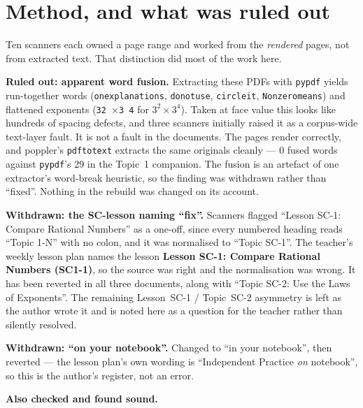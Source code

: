 \documentclass[11pt]{article}
\begin{document}
\section*{Method, and what was ruled out}
Ten scanners each owned a page range and worked from the \emph{rendered} pages,
not from extracted text. That distinction did most of the work here.

\medskip\noindent\textbf{Ruled out: apparent word fusion.}
Extracting these PDFs with \texttt{pypdf} yields run-together words
(\texttt{onexplanations}, \texttt{donotuse}, \texttt{circleit},
\texttt{Nonzeromeans}) and flattened exponents (\texttt{32 $\times$3 4} for
$3^2\times3^4$). Taken at face value this looks like hundreds of spacing
defects, and three scanners initially raised it as a corpus-wide text-layer
fault. It is not a fault in the documents. The pages render correctly, and
poppler's \texttt{pdftotext} extracts the same originals cleanly --- 0 fused
words against \texttt{pypdf}'s 29 in the Topic~1 companion. The fusion is an
artefact of one extractor's word-break heuristic, so the finding was withdrawn
rather than ``fixed''. Nothing in the rebuild was changed on its account.

\medskip\noindent\textbf{Withdrawn: the SC-lesson naming ``fix''.} Scanners
flagged ``Lesson SC-1: Compare Rational Numbers'' as a one-off, since every
numbered heading reads ``Topic 1-N'' with no colon, and it was normalised to
``Topic SC-1''. The teacher's weekly lesson plan names the lesson
\textbf{Lesson SC-1: Compare Rational Numbers (SC1-1)}, so the source was right
and the normalisation was wrong. It has been reverted in all three documents,
along with ``Topic SC-2: Use the Laws of Exponents''. The remaining
Lesson~SC-1 / Topic~SC-2 asymmetry is left as the author wrote it and is noted
here as a question for the teacher rather than silently resolved.

\medskip\noindent\textbf{Withdrawn: ``on your notebook''.} Changed to ``in your
notebook'', then reverted --- the lesson plan's own wording is ``Independent
Practice \emph{on} notebook'', so this is the author's register, not an error.

\medskip\noindent\textbf{Also checked and found sound.}
\end{document}
